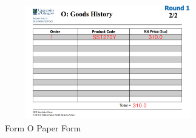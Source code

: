 \begin{figure}[!h]
\begin{center}
\includegraphics[width=9cm, height=5cm]{figures/OrderHistoryPaper}
\end{center}
\caption{Form O Paper Form}
\label{fig:OrderHistoryPaper}
\end{figure}
